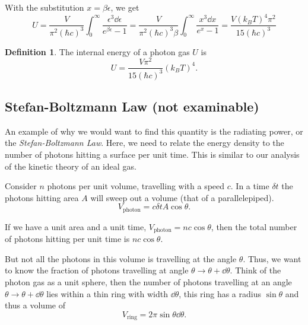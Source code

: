 \documentclass[12pt,chapterprefix=false,dvipsnames]{scrbook}
\theoremstyle{dotless}
\theoremstyle{definition}
\newtheorem{protodefinition}{Definition}[section]
\newenvironment{definition}
{\colorlet{shadecolor}{black!15}\begin{shaded}\begin{protodefinition}}
			{\end{protodefinition}\end{shaded}}
\begin{document}
With the substitution $x = \beta\epsilon$, we get
\begin{equation}
	\label{eq:photon_gas_intermediate_derivation}
	U = \frac{V}{\pi^2{\left(\hbar c\right)}^3}
	\int^\infty_0\frac{\epsilon^3\dd{\epsilon}}{e^{\beta\epsilon} - 1} =
	\frac{V}{\pi^2{\left(\hbar c\right)}^3\beta}\int_0^\infty\frac{x^3\dd{x}}{e^x-1}
	= \frac{V{\left(k_B T\right)}^4\pi^2}{15{\left(\hbar c\right)}^3}
\end{equation}

\begin{definition}
	The internal energy of a photon gas $U$ is
	\begin{equation}
		U = \frac{V\pi^2}{15{\left(\hbar c\right)}^3}{\left(k_B T\right)}^4.
	\end{equation}
\end{definition}

\subsection{Stefan-Boltzmann Law (not examinable)}%
\label{sub:stefan_boltzmann_law_not_examinable_}

An example of why we would want to find this quantity is the
radiating power, or the \textit{Stefan-Boltzmann Law}. Here, we need
to relate the energy density to the number of photons hitting a
surface per unit time. This is similar to our analysis of the
kinetic theory of an ideal gas.

Consider $n$ photons per unit volume,
travelling with a speed $c$. In a time
$\delta{t}$ the photons hitting area
$A$ will sweep out a volume (that of a
parallelepiped).
\begin{equation}
	V_\mathrm{photon} = c\delta tA\cos{\theta}.
\end{equation}

If we have a unit area and a unit time, $V_\mathrm{photon} = nc\cos{\theta}$,
then the total number of photons hitting per unit time is
$nc\cos{\theta}$.

But not all the photons in this volume is travelling at the
angle $\theta$. Thus, we want to know the
fraction of photons travelling at angle $\theta\rightarrow\theta + \dd{\theta}$.
Think of the photon gas as a unit sphere, then the number of
photons travelling at an angle $\theta\rightarrow\theta + \dd{\theta}$ lies
within a thin ring with width $\dd{\theta}$, this ring
has a radius $\sin{\theta}$ and thus a volume of
\begin{equation} V_\mathrm{ring} =
	2\pi\sin{\theta}\dd{\theta}.
\end{equation}
\end{document}
